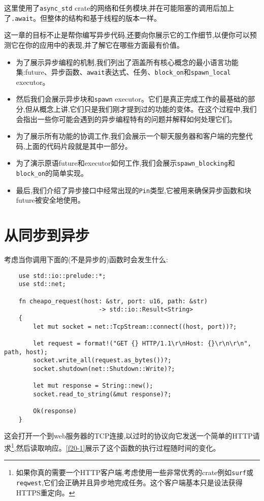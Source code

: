 这里使用了\texttt{async\_std} crate的网络和任务模块,并在可能阻塞的调用后加上了\texttt{.await}。但整体的结构和基于线程的版本一样。

这一章的目标不止是帮你编写异步代码,还要向你展示它的工作细节,以便你可以预测它在你的应用中的表现,并了解它在哪些方面最有价值。

\begin{itemize}
    \item 为了展示异步编程的机制,我们列出了涵盖所有核心概念的最小语言功能集:future、异步函数、\texttt{await}表达式、任务、\texttt{block\_on}和\texttt{spawn\_local} executor。
    \item 然后我们会展示异步块和\texttt{spawn} executor。它们是真正完成工作的最基础的部分,但从概念上讲,它们只是我们刚才提到过的功能的变体。在这个过程中,我们会指出一些你可能会遇到的异步编程特有的问题并解释如何处理它们。
    \item 为了展示所有功能的协调工作,我们会展示一个聊天服务器和客户端的完整代码,上面的代码片段就是其中一部分。
    \item 为了演示原语future和executor如何工作,我们会展示\texttt{spawn\_blocking}和\texttt{block\_on}的简单实现。
    \item 最后,我们介绍了异步接口中经常出现的\texttt{Pin}类型,它被用来确保异步函数和块future被安全地使用。
\end{itemize}

\section{从同步到异步}

考虑当你调用下面的(不是异步的)函数时会发生什么:
\begin{verbatim}
    use std::io::prelude::*;
    use std::net;

    fn cheapo_request(host: &str, port: u16, path: &str)
                          -> std::io::Result<String>
    {
        let mut socket = net::TcpStream::connect((host, port))?;

        let request = format!("GET {} HTTP/1.1\r\nHost: {}\r\n\r\n", path, host);
        socket.write_all(request.as_bytes())?;
        socket.shutdown(net::Shutdown::Write)?;

        let mut response = String::new();
        socket.read_to_string(&mut response)?;

        Ok(response)
    }
\end{verbatim}

这会打开一个到web服务器的TCP连接,以过时的协议向它发送一个简单的HTTP请求\footnote{如果你真的需要一个HTTP客户端,考虑使用一些非常优秀的crate例如\texttt{surf}或\texttt{reqwest},它们会正确并且异步地完成任务。这个客户端基本只是设法获得HTTPS重定向。},然后读取响应。\autoref{f20-1}展示了这个函数的执行过程随时间的变化。

